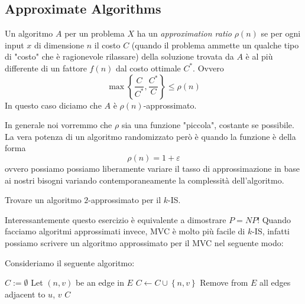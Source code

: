 \documentclass[11pt]{scrartcl}
\begin{document}
	\subsection{Approximate Algorithms}
	
	\begin{definition}
		Un algoritmo $A$ per un problema $X$ ha un \textit{approximation ratio} $\rho(n)$ se per ogni input $x$ di dimensione $n$ il costo $C$ (quando il problema ammette un qualche tipo di "costo" che è ragionevole rilassare) della soluzione trovata da $A$ è al più differente di un fattore $f(n)$ dal costo ottimale $C^*$. Ovvero
		$$\max\left\{\frac{C}{C^*},\frac{C^*}{C}\right\}\le \rho(n)$$
		In questo caso diciamo che $A$ è $\rho(n)$-approssimato.
	\end{definition}
	In generale noi vorremmo che $\rho$ sia una funzione "piccola", costante se possibile. La vera potenza di un algoritmo randomizzato però è quando la funzione è della forma
	$$\rho(n)=1+\varepsilon$$
	ovvero possiamo possiamo liberamente variare il tasso di approssimazione in base ai nostri bisogni variando contemporaneamente la complessità dell'algoritmo.
	\begin{exercise}
		Trovare un algoritmo $2$-approssimato per il $k$-IS. 
	\end{exercise}
	Interessantemente questo esercizio è equivalente a dimostrare $P=NP$! Quando facciamo algoritmi approssimati invece, MVC è molto più facile di $k$-IS, infatti possiamo scrivere un algoritmo approssimato per il MVC nel seguente modo:
	\begin{algorithm}
		Consideriamo il seguente algoritmo:
		\begin{algorithmic}[1]
				\State $C:=\emptyset$
					\State Let $(n,v)$ be an edge in $E$
					\State $C\gets C\cup \left\{n,v\right\}$
					\State Remove from $E$ all edges adjacent to $u$, $v$
				\EndWhile
				\State \Return $C$
			\EndFunction
		\end{algorithmic}
	\end{algorithm}
	
\end{document}
